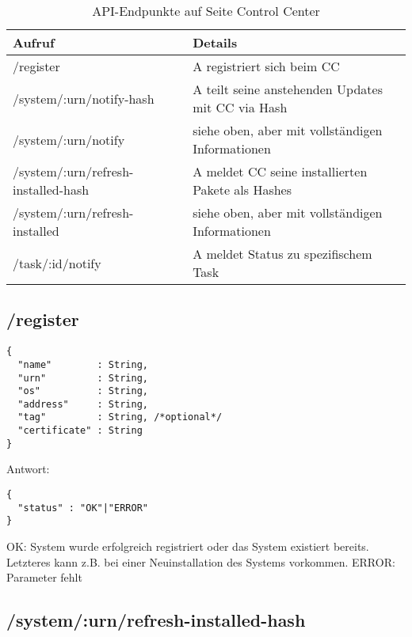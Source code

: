 \begin{table}[H]
    \centering
    \caption{API-Endpunkte auf Seite Control Center}
    \label{api:endpoints_cc}
    \begin{tabular}{ll}
        \hline
        \textbf{Aufruf}                     & \textbf{Details}                                  \\ \hline
        /register                           & A registriert sich beim CC                        \\
        /system/:urn/notify-hash            & A teilt seine anstehenden Updates mit CC via Hash \\
        /system/:urn/notify                 & siehe oben, aber mit vollständigen Informationen  \\
        /system/:urn/refresh-installed-hash & A meldet CC seine installierten Pakete als Hashes \\
        /system/:urn/refresh-installed      & siehe oben, aber mit vollständigen Informationen  \\
        /task/:id/notify                    & A meldet Status zu spezifischem Task              \\ \hline
    \end{tabular}
\end{table}

\subsection*{/register}

\begin{verbatim}
{
  "name"        : String,
  "urn"         : String,
  "os"          : String,
  "address"     : String,
  "tag"         : String, /*optional*/
  "certificate" : String
}
\end{verbatim}


Antwort:

\begin{verbatim}
{
  "status" : "OK"|"ERROR" 
}
\end{verbatim}

OK: System wurde erfolgreich registriert oder das System existiert bereits. Letzteres kann z.B. bei einer Neuinstallation des Systems vorkommen.
ERROR: Parameter fehlt

\subsection*{/system/:urn/refresh-installed-hash}

